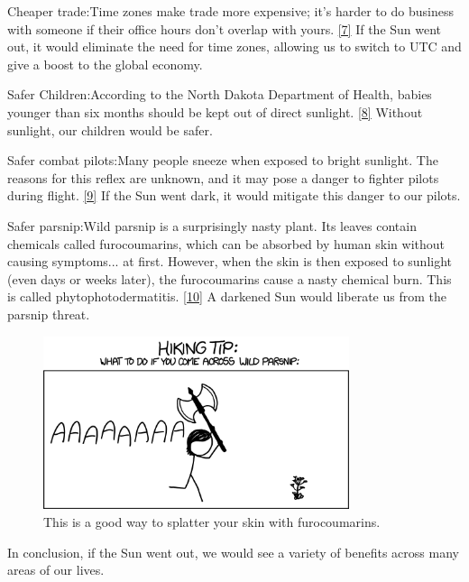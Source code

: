 {{Cheaper trade:Time zones make trade more expensive; it's harder to do business with someone if their office hours don't overlap with yours. \href{http://eeecon.uibk.ac.at/wopec2/repec/inn/wpaper/2012-14.pdf}{[7]} If the Sun went out, it would eliminate the need for time zones, allowing us to switch to UTC and give a boost to the global economy.}

{Safer Children:According to the North Dakota Department of Health, babies younger than six months should be kept out of direct sunlight. \href{http://www.ndhealth.gov/familyhealth/mch/babyfacts/Sunburn.pdf}{[8]} Without sunlight, our children would be safer.}

{Safer combat pilots:Many people sneeze when exposed to bright sunlight. The reasons for this reflex are unknown, and it may pose a danger to fighter pilots during flight. \href{http://www.ncbi.nlm.nih.gov/pubmed/8108024}{[9]} If the Sun went dark, it would mitigate this danger to our pilots.}

{Safer parsnip:Wild parsnip is a surprisingly nasty plant. Its leaves contain chemicals called furocoumarins, which can be absorbed by human skin without causing symptoms... at first. However, when the skin is then exposed to sunlight (even days or weeks later), the furocoumarins cause a nasty chemical burn. This is called phytophotodermatitis. \href{http://dnr.wi.gov/wnrmag/html/stories/1999/jun99/parsnip.htm}{[10]} A darkened Sun would liberate us from the parsnip threat.}

\begin{figure}[!htbp]
\centering
\includegraphics[scale=0.5, max width=0.8\textwidth]{imgs/a/49/sunless_parsnip.png}
\caption{This is a good way to splatter your skin with furocoumarins.}
\end{figure}

{In conclusion, if the Sun went out, we would see a variety of benefits across many areas of our lives.}

}
